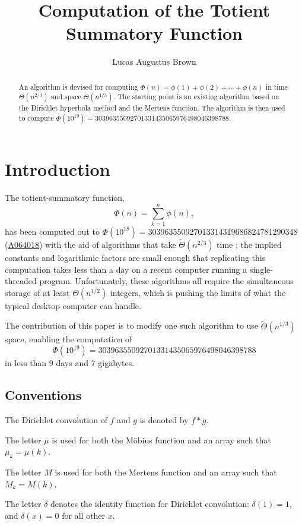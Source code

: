 \documentclass[12pt]{article}
\title{Computation of the Totient Summatory Function}
\author{Lucas Augustus Brown \orcidlink{0000-0002-6000-3735}}
\date{\currentdate}
\newcommand{\eqn}[1]{\begin{displaymath} #1 \end{displaymath}}
\newcommand{\seqnum}[1]{\href{https://oeis.org/#1}{#1}}
\newcommand{\softTheta}[0]{\widetilde{\Theta}}
\begin{document}
\maketitle %
\begin{abstract}
An algorithm is devised for computing $\Phi(n) = \phi(1) + \phi(2) + \cdots + \phi(n)$ in time $\softTheta(n^{2/3})$ and space $\softTheta(n^{1/3})$.  The starting point is an existing algorithm based on the Dirichlet hyperbola method and the Mertens function.  The algorithm is then used to compute $\Phi(10^{19}) = 30396355092701331435065976498046398788$.
\end{abstract}

\section{Introduction}

The totient-summatory function,
\eqn{\Phi(n) = \sum_{k=1}^n \phi(n),}
has been computed out to $\Phi(10^{18})=303963550927013314319686824781290348$ (\seqnum{A064018}) with the aid of algorithms that take $\softTheta(n^{2/3})$ time \cite{griff2023,adamant2023}; the implied constants and logarithmic factors are small enough that replicating this computation takes less than a day on a recent computer running a single-threaded program.  Unfortunately, these algorithms all require the simultaneous storage of at least $\Theta(n^{1/2})$ integers, which is pushing the limits of what the typical desktop computer can handle.

The contribution of this paper is to modify one such algorithm \cite[\texttt{totientSummatoryFast1}]{griff2023} to use $\softTheta(n^{1/3})$ space, enabling the computation of
\eqn{\Phi(10^{19}) = 30396355092701331435065976498046398788}
in less than 9 days and 7 gigabytes.

\subsection{Conventions}

The Dirichlet convolution of $f$ and $g$ is denoted by $f*g$.

The letter $\mu$ is used for both the M\"{o}bius function and an array such that $\mu_k = \mu(k)$.

The letter $M$ is used for both the Mertens function and an array such that $M_k = M(k)$.

The letter $\delta$ denotes the identity function for Dirichlet convolution: $\delta(1)=1$, and $\delta(x)=0$ for all other $x$.
\end{document}
